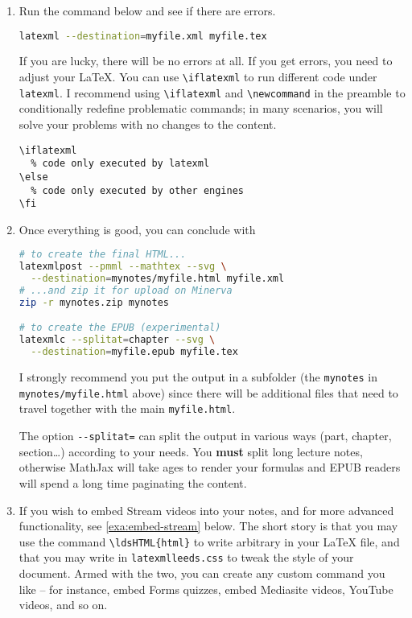 \documentclass[a4paper]{article}
\def\ltxinline{\lstinline[style=latexml,frame=none]}
\theoremstyle{definition}
\begin{document}
\begin{enumerate}
\begin{lstlisting}[style=latexml]
% to improve the HTML style, \ldsHTML and other goodies
% load *after* loading all the other packages
\usepackage{latexmlleeds}
  \end{lstlisting}
  to your preamble. You should load \verb|latexmlleeds| \emph{after} loading all the other packages.
  \item Run the command below and see if there are errors.
  \begin{lstlisting}[language=bash]
latexml --destination=myfile.xml myfile.tex
  \end{lstlisting}
  If you are lucky, there will be no errors at all. If you get errors, you need to adjust your \LaTeX{}. You can use \ltxinline|\iflatexml| to run different code under \verb|latexml|. I recommend using \ltxinline|\iflatexml| and \ltxinline|\newcommand| in the preamble to conditionally redefine problematic commands; in many scenarios, you will solve your problems with no changes to the content.
  \begin{lstlisting}[style=latexml]
\iflatexml
  % code only executed by latexml
\else
  % code only executed by other engines
\fi
  \end{lstlisting}
  \item Once everything is good, you can conclude with
  \begin{lstlisting}[language=bash]
# to create the final HTML...
latexmlpost --pmml --mathtex --svg \
  --destination=mynotes/myfile.html myfile.xml
# ...and zip it for upload on Minerva
zip -r mynotes.zip mynotes

# to create the EPUB (experimental)
latexmlc --splitat=chapter --svg \
  --destination=myfile.epub myfile.tex
  \end{lstlisting}
  I strongly recommend you put the output in a subfolder (the \verb|mynotes| in \verb|mynotes/myfile.html| above) since there will be additional files that need to travel together with the main \verb|myfile.html|.

  The option \verb|--splitat=| can split the output in various ways (part, chapter, section\dots{}) according to your needs. You \textbf{must} split long lecture notes, otherwise MathJax will take ages to render your formulas and EPUB readers will spend a long time paginating the content.
  \item If you wish to embed Stream videos into your notes, and for more advanced functionality, see \autoref{exa:embed-stream} below. The short story is that you may use the command \ltxinline|\ldsHTML{html}| to write arbitrary \HTML{} in your \LaTeX{} file, and that you may write in \verb|latexmlleeds.css| to tweak the style of your document. Armed with the two, you can create any custom command you like -- for instance, embed Forms quizzes, embed Mediasite videos, YouTube videos, and so on.
\end{enumerate}
\end{document}
